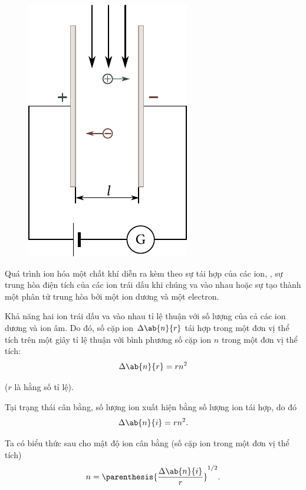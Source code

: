 \begin{figure}[t]
	\begin{center}
		\includegraphics[scale=1]{figures/ch_12/fig_12_1.pdf}
		\caption[]{}
		\label{fig:12_1}
	\end{center}
	\vspace{-0.8cm}
\end{figure}

Quá trình ion hóa một chất khí diễn ra kèm theo sự tái hợp của các ion, \ie, sự trung hòa điện tích của các ion trái dấu khi chúng va vào nhau hoặc sự tạo thành một phân tử trung hòa bởi một ion dương và một electron.

Khả năng hai ion trái dấu va vào nhau tỉ lệ thuận với số lượng của cả các ion dương và ion âm.
Do đó, số cặp ion $\Delta{\ab{n}{r}}$ tái hợp trong một đơn vị thể tích trên một giây tỉ lệ thuận với bình phương số cặp ion $n$ trong một đơn vị thể tích:
\begin{equation}\label{eq:12_1}
    \Delta{\ab{n}{r}} = rn^2
\end{equation}

\noindent
($r$ là hằng số tỉ lệ).

Tại trạng thái cân bằng, số lượng ion xuất hiện bằng số lượng ion tái hợp, do đó
\begin{equation}\label{eq:12_2}
    \Delta{\ab{n}{i}} = rn^2.
\end{equation}

\noindent
Ta có biểu thức sau cho mật độ ion cân bằng (số cặp ion trong một đơn vị thể tích)
\begin{equation}\label{eq:12_3}
    n = \parenthesis{\frac{\Delta{\ab{n}{i}}}{r}}^{1/2}.
\end{equation}

